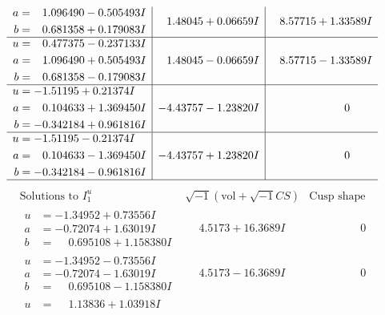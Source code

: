 \documentclass[1p]{elsarticle_modified}
\theoremstyle{definition}
\newcommand{\I}{\sqrt{-1}}
\begin{document}
$$\begin{array}{c|c|c}
\begin{aligned}
a &= \phantom{-}1.096490 - 0.505493 I \\
b &= \phantom{-}0.681358 + 0.179083 I\end{aligned}
 & \phantom{-}1.48045 + 0.06659 I & \phantom{-}8.57715 + 1.33589 I \\ \hline\begin{aligned}
u &= \phantom{-}0.477375 - 0.237133 I \\
a &= \phantom{-}1.096490 + 0.505493 I \\
b &= \phantom{-}0.681358 - 0.179083 I\end{aligned}
 & \phantom{-}1.48045 - 0.06659 I & \phantom{-}8.57715 - 1.33589 I \\ \hline\begin{aligned}
u &= -1.51195 + 0.21374 I \\
a &= \phantom{-}0.104633 + 1.369450 I \\
b &= -0.342184 + 0.961816 I\end{aligned}
 & -4.43757 - 1.23820 I & \phantom{-0.000000 } 0 \\ \hline\begin{aligned}
u &= -1.51195 - 0.21374 I \\
a &= \phantom{-}0.104633 - 1.369450 I \\
b &= -0.342184 - 0.961816 I\end{aligned}
 & -4.43757 + 1.23820 I & \phantom{-0.000000 } 0\\
 \hline 
 \end{array}$$\newpage$$\begin{array}{c|c|c}  
\text{Solutions to }I^u_{1}& \I (\text{vol} + \sqrt{-1}CS) & \text{Cusp shape}\\
 \hline 
\begin{aligned}
u &= -1.34952 + 0.73556 I \\
a &= -0.72074 + 1.63019 I \\
b &= \phantom{-}0.695108 + 1.158380 I\end{aligned}
 & \phantom{-}4.5173 + 16.3689 I & \phantom{-0.000000 } 0 \\ \hline\begin{aligned}
u &= -1.34952 - 0.73556 I \\
a &= -0.72074 - 1.63019 I \\
b &= \phantom{-}0.695108 - 1.158380 I\end{aligned}
 & \phantom{-}4.5173 - 16.3689 I & \phantom{-0.000000 } 0 \\ \hline\begin{aligned}
u &= \phantom{-}1.13836 + 1.03918 I \\

\end{aligned}
\end{array}$$
\end{document}
